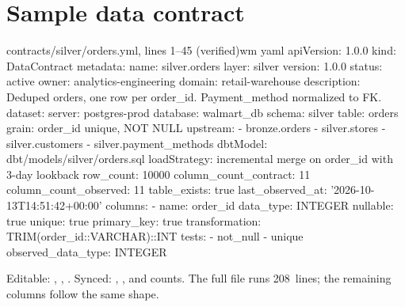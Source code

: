 \chapter{Sample data contract}

\begin{wmlisting}{contracts/silver/orders.yml, lines 1--45 (verified)}{wm yaml}
apiVersion: 1.0.0
kind: DataContract
metadata:
  name: silver.orders
  layer: silver
  version: 1.0.0
  status: active
  owner: analytics-engineering
  domain: retail-warehouse
  description: Deduped orders, one row per order_id. Payment_method normalized to
    FK.
dataset:
  server: postgres-prod
  database: walmart_db
  schema: silver
  table: orders
  grain: order_id unique, NOT NULL
  upstream:
  - bronze.orders
  - silver.stores
  - silver.customers
  - silver.payment_methods
  dbtModel: dbt/models/silver/orders.sql
  loadStrategy: incremental merge on order_id with 3-day lookback
  row_count: 10000
  column_count_contract: 11
  column_count_observed: 11
  table_exists: true
  last_observed_at: '2026-10-13T14:51:42+00:00'
columns:
- name: order_id
  data_type: INTEGER
  nullable: true
  unique: true
  primary_key: true
  transformation: TRIM(order_id::VARCHAR)::INT
  tests:
  - not_null
  - unique
  observed_data_type: INTEGER
\end{wmlisting}

Editable: , , . Synced: , ,  and counts. The full file runs 208~lines; the remaining columns follow the same shape.
